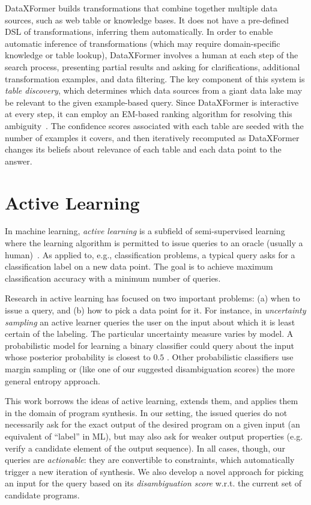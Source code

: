 DataXFormer builds transformations that combine together multiple data sources, such as web table or knowledge bases.
It does not have a pre-defined DSL of transformations, inferring them automatically.
In order to enable automatic inference of transformations (which may require domain-specific knowledge or table lookup),
DataXFormer involves a human at each step of the search process, presenting partial results and asking for
clarifications, additional transformation examples, and data filtering.
The key component of this system is \emph{table discovery}, which determines which data sources from a giant data lake
may be relevant to the given example-based query.
Since DataXFormer is interactive at every step, it can employ an EM-based ranking algorithm for resolving this
ambiguity~\cite{dataxformer}.
The confidence scores associated with each table are seeded with the number of examples it covers, and then iteratively
recomputed as DataXFormer changes its beliefs about relevance of each table and each data point to the answer.

\section{Active Learning}
In machine learning, \emph{active learning} is a subfield of semi-supervised learning where the learning algorithm is
permitted to issue queries to an oracle (usually a human)~\cite{al:settles}.
As applied to, e.g., classification problems, a typical query asks for a classification label on a new data point.
The goal is to achieve maximum classification accuracy with a minimum number of queries.

Research in active learning has focused on two important problems: (a) when to issue a query, and (b) how to pick a data
point for it.
For instance, in \emph{uncertainty sampling} \cite{lewis} an active learner queries the user on the input about which it
is least certain of the labeling.
The particular uncertainty measure varies by model.
A probabilistic model for learning a binary classifier could query about the input whose posterior probability is
closest to $0.5$ \cite{lewis}.
Other probabilistic classifiers use margin sampling \cite{marginSampling} or (like one of our suggested disambiguation
scores) the more general entropy approach.

This work borrows the ideas of active learning, extends them, and applies them in the domain of program synthesis.
In our setting, the issued queries do not necessarily ask for the exact output of the desired program on a given input
(an equivalent of ``label'' in ML), but may also ask for weaker output properties (e.g.
verify a candidate element of the output sequence).
In all cases, though, our queries are \emph{actionable}: they are convertible to constraints, which automatically
trigger a new iteration of synthesis.
We also develop a novel approach for picking an input for the query based on its \emph{disambiguation score} w.r.t.
the current set of candidate programs.
